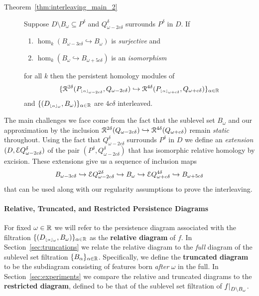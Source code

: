 \begin{description}
  \item[Theorem~\ref{thm:interleaving_main_2}] Suppose $D\setminus B_\omega\subseteq P^\delta$ and  $Q_{\omega-2c\delta}^\delta$ surrounds $P^\delta$ in $D$.
    If
    \begin{enumerate}[label=\Roman*.]
      \item $\hom_k(B_{\omega-3c\delta}\hookrightarrow B_\omega)$ is \emph{surjective} and
      \item $\hom_k(B_\omega\hookrightarrow B_{\omega+5c\delta})$ is an \emph{isomorphism}
    \end{enumerate}
    for all $k$ then the persistent homology modules of
    \[ \{\mathcal{R}^{2\delta}(P_{\scriptscriptstyle \lfloor\alpha\rfloor_{\omega-2c\delta}}, Q_{\omega-2c\delta})\hookrightarrow \mathcal{R}^{4\delta}(P_{\scriptscriptstyle \lfloor\alpha\rfloor_{\omega+c\delta}}, Q_{\omega+c\delta})\}_{\alpha\in\mathbb{R}}\]
    and $\{(D_{\scriptscriptstyle \lfloor\alpha\rfloor_{\omega}}, B_\omega)\}_{\alpha\in\mathbb{R}}$ are $4c\delta$ interleaved.
\end{description}

The main challenges we face come from the fact that the sublevel set $B_\omega$ and our approximation by the inclusion $\mathcal{R}^{2\delta}(Q_{\omega-2c\delta})\hookrightarrow \mathcal{R}^{4\delta}(Q_{\omega+c\delta})$ remain \emph{static} throughout.
Using the fact that $Q_{\omega-2c\delta}^\delta$ surrounds $P^\delta$ in $D$ we define an \emph{extension} $(D,\mathcal{E} Q_{\omega-2c\delta}^\delta)$ of the pair $(P^\delta, Q_{\omega-2c\delta}^\delta)$ that has isomorphic relative homology by excision.
These extensions give us a sequence of inclusion maps
\[ B_{\omega-3c\delta}\hookrightarrow \mathcal{E} Q_{\omega-2c\delta}^{2\delta}\hookrightarrow B_\omega\hookrightarrow \mathcal{E} Q_{\omega+c\delta}^{4\delta}\hookrightarrow B_{\omega+5c\delta}\]
that can be used along with our regularity assumptions to prove the interleaving. %

\paragraph*{Relative, Truncated, and Restricted Persistence Diagrams}

For fixed $\omega\in\mathbb{R}$ we will refer to the persistence diagram associated with the filtration $\{(D_{\scriptscriptstyle \lfloor\alpha\rfloor_{\omega}}, B_\omega)\}_{\alpha\in\mathbb{R}}$  as the \textbf{relative diagram} of $f$.
In Section~\ref{sec:truncations} we relate the relative diagram to the \emph{full} diagram of the sublevel set filtration $\{B_\alpha\}_{\alpha\in\mathbb{R}}$.
Specifically, we define the \textbf{truncated diagram} to be the subdiagram consisting of features born \emph{after} $\omega$ in the full.
In Section~\ref{sec:experiments} we compare the relative and truncated diagrams to the \textbf{restricted diagram}, defined to be that of the sublevel set filtration of $f\mathord{\mid}_{D\setminus B_\omega}$.%


